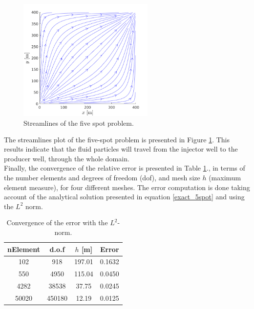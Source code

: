 \documentclass[review]{elsarticle}
\begin{document}
\begin{figure}[H]
		\centering
		\includegraphics[width=0.6\textwidth]{./Figures/Examples/FiveSpot/5puntos2stream_2.pdf}
		\caption[Test geometry 1]{Streamlines of the five spot problem.}
		\label{fig:5puntos2stream1}
\end{figure}


 The streamlines plot of the five-spot problem is presented in Figure \ref{fig:5puntos2stream1}. This results indicate that the fluid particles will travel from the injector well to the producer well, through the whole domain. \\


Finally, the convergence of the relative error is presented in Table \ref{error5spot}., in terms of the number elements and degrees of freedom (dof), and mesh size $h$ (maximum element measure), for four different meshes. The error computation is done taking account of the analytical solution presented in equation \eqref{exact_5spot} and using the $L^2$ norm.

\begin{table}[H]
	\begin{center}
		\begin{tabular}{|c||c|c|c|}
			\hline
			nElement & d.o.f  & $h$ [m] & Error \\ \hline\hline
			 102     & 918    & 197.01  & 0.1632\\
			 550     & 4950   & 115.04  & 0.0450\\ 	
			 4282    & 38538  & 37.75   & 0.0245\\
			 50020   & 450180 & 12.19   & 0.0125
	 		\\ 
			
			\hline	
		\end{tabular}
		\caption{Convergence of the error with the $L^2$-norm.}\label{error5spot}
	\end{center}
\end{table}
\end{document}
